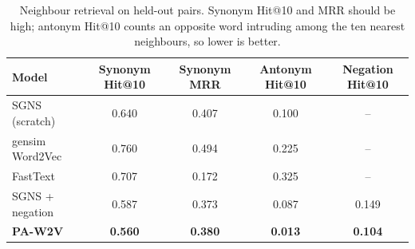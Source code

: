 \begin{table}[H]
\centering
\footnotesize
\caption{Neighbour retrieval on held-out pairs. Synonym Hit@10 and MRR should be high; antonym Hit@10 counts an opposite word intruding among the ten nearest neighbours, so lower is better.}
\label{tab:w2vhits}
\begin{tabular}{lcccc}
\toprule
Model & Synonym Hit@10 & Synonym MRR & Antonym Hit@10 & Negation Hit@10 \\
\midrule
SGNS (scratch) & 0.640 & 0.407 & 0.100 & -- \\
gensim Word2Vec & 0.760 & 0.494 & 0.225 & -- \\
FastText & 0.707 & 0.172 & 0.325 & -- \\
SGNS + negation & 0.587 & 0.373 & 0.087 & 0.149 \\
\textbf{PA-W2V} & \textbf{0.560} & \textbf{0.380} & \textbf{0.013} & \textbf{0.104} \\
\bottomrule
\end{tabular}
\end{table}